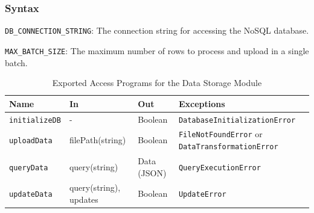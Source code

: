 \documentclass[12pt, titlepage]{article}
\begin{document}
\subsubsection{Syntax}
\begin{description}
  \item[Exported Constants and Access Programs:]
  \item 
  \texttt{DB\_CONNECTION\_STRING}: The connection string for accessing the
    NoSQL database.
  \item
  \texttt{MAX\_BATCH\_SIZE}: The maximum number of rows to process and upload
  in a single batch.

  \begin{table}[h!]
    \centering
    \begin{tabular}{p{} p{} p{} p{}}
    \toprule
    \textbf{Name} & \textbf{In} & \textbf{Out} & \textbf{Exceptions}\\
    \midrule
    
    \texttt{initializeDB} & - & Boolean & \texttt{DatabaseInitializationError} \\
    \midrule
    
    \texttt{uploadData} & filePath(string) & Boolean &
    \texttt{FileNotFoundError} or \texttt{DataTransformationError} \\
    \midrule

    \texttt{queryData} & query(string) & Data (JSON) & \texttt{QueryExecutionError}\\
    \midrule

    \texttt{updateData} & query(string), updates & Boolean & \texttt{UpdateError} \\
    \bottomrule
    
    \end{tabular}
    \caption{Exported Access Programs for the Data Storage Module}
    \label{TblEAP_Storage}
  \end{table}
\end{description}
\end{document}
